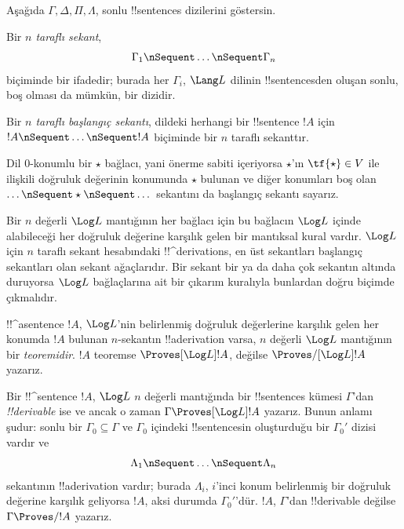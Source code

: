 \documentclass[../../../include/open-logic-section]{subfiles}
\begin{document}


Aşağıda $\Gamma,\Delta,\Pi,\Lambda$, sonlu !!{sentence}s dizilerini
göstersin.

\begin{defn}[Sekant]
Bir \emph{$n$ taraflı sekant},
\[
\Gamma_1 \nSequent \dots \nSequent \Gamma_n
\]
biçiminde bir ifadedir; burada her $\Gamma_i$, $\Lang L$ dilinin
!!{sentence}s{}den oluşan sonlu, boş olması da mümkün, bir dizidir.
\end{defn}

\begin{defn}
Bir \emph{$n$ taraflı başlangıç sekantı}, dildeki herhangi bir !!{sentence}
$!A$ için $!A\nSequent\dots\nSequent !A$ biçiminde bir $n$ taraflı
sekanttır.

Dil $0$-konumlu bir $\star$ bağlacı, yani önerme sabiti içeriyorsa
$\star$'ın $\tf{\star}\in V$ ile ilişkili doğruluk değerinin konumunda
$\star$ bulunan ve diğer konumları boş olan
$\dots\nSequent\star\nSequent\dots$ sekantını da başlangıç sekantı sayarız.
\end{defn}

Bir $n$ değerli $\Log L$ mantığının her bağlacı için bu bağlacın $\Log L$
içinde alabileceği her doğruluk değerine karşılık gelen bir mantıksal kural
vardır. $\Log L$ için $n$ taraflı sekant hesabındaki !!^{derivation}s,
en üst sekantları başlangıç sekantları olan sekant ağaçlarıdır. Bir sekant
bir ya da daha çok sekantın altında duruyorsa $\Log L$ bağlaçlarına ait bir
çıkarım kuralıyla bunlardan doğru biçimde çıkmalıdır.

\begin{defn}[Teoremler]
!!^a{sentence} $!A$, $\Log L$'nin belirlenmiş doğruluk değerlerine karşılık
gelen her konumda $!A$ bulunan $n$-sekantın !!a{derivation} varsa, $n$
değerli $\Log L$ mantığının bir \emph{teoremidir}. $!A$ teoremse
$\Proves[\Log L]!A$, değilse $\Proves/[\Log L]!A$ yazarız.
\end{defn}

\begin{defn}[!!^{derivability}]
Bir !!^{sentence} $!A$, $\Log L$ $n$ değerli mantığında bir !!{sentence}s
kümesi $\Gamma$'dan \emph{!!{derivable}} ise ve ancak o zaman
$\Gamma\Proves[\Log L]!A$ yazarız. Bunun anlamı şudur: sonlu bir
$\Gamma_0\subseteq\Gamma$ ve $\Gamma_0$ içindeki !!{sentence}s{}in oluşturduğu
bir $\Gamma_0'$ dizisi vardır ve
\[ \Lambda_1 \nSequent \dots \nSequent \Lambda_n \]
sekantının !!a{derivation} vardır; burada $\Lambda_i$, $i$'inci konum
belirlenmiş bir doğruluk değerine karşılık geliyorsa $!A$, aksi durumda
$\Gamma_0'$'dür. $!A$, $\Gamma$'dan !!{derivable} değilse
$\Gamma\Proves/!A$ yazarız.
\end{defn}
\end{document}
